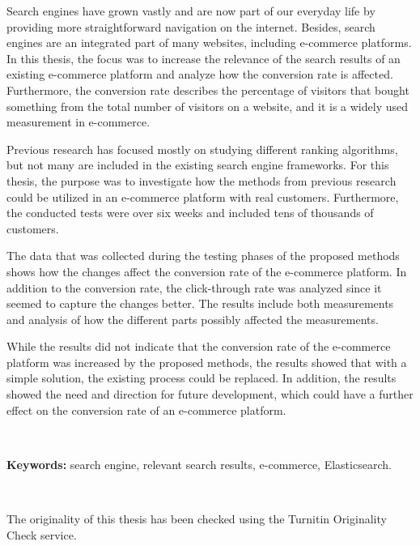

\noindent 
Search engines have grown vastly and are now part of our everyday life 
by providing more straightforward navigation on the internet.
Besides, search engines are an integrated part of many websites, including e-commerce 
platforms.
In this thesis, the focus was to increase the relevance of the search results
of an existing e-commerce platform and analyze how the conversion rate is affected.
Furthermore, the conversion rate describes the percentage of visitors that 
bought something from the total number of visitors on a website, and it is a widely
used measurement in e-commerce.


Previous research has focused mostly on studying different ranking algorithms, but not
many are included in the existing search engine frameworks.
For this thesis, the purpose was to investigate how the methods from previous 
research could be utilized in an e-commerce platform with real customers.
Furthermore, the conducted tests were over six weeks and included tens of thousands
of customers.

The data that was collected during the testing phases of the proposed methods
shows how the changes affect the conversion rate of the e-commerce platform.
In addition to the conversion rate, the click-through rate was analyzed since 
it seemed to capture the changes better.
The results include both measurements and analysis of how the different
parts possibly affected the measurements.

While the results did not indicate that the conversion rate of the e-commerce platform
was increased by the proposed methods, the results showed that with a simple 
solution, the existing process could be replaced.
In addition, the results showed the need and direction for future development, which could
have a further effect on the conversion rate of an e-commerce platform.


~

\noindent\textbf{Keywords:} search engine, relevant search results, e-commerce, Elasticsearch.

~

\noindent The originality of this thesis has been checked using the Turnitin Originality Check service.

\clearpage
